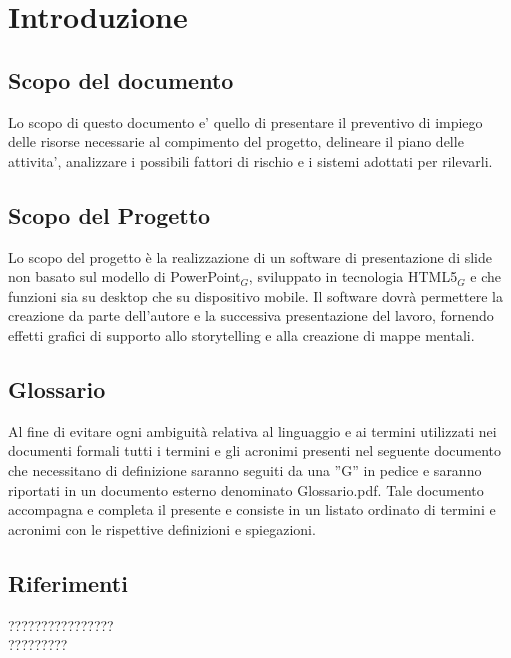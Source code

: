 \section{Introduzione}

\subsection{Scopo del documento}
Lo scopo di questo documento e' quello di presentare il preventivo di impiego delle risorse necessarie al compimento del progetto, delineare il piano delle attivita', analizzare i possibili fattori di rischio e i sistemi adottati per rilevarli.

\subsection{Scopo del Progetto}
Lo scopo del progetto è la realizzazione di un software di presentazione di slide non basato sul modello di PowerPoint$_{G}$, sviluppato in tecnologia HTML5$_{G}$ e che funzioni sia su desktop che su dispositivo mobile. Il software dovrà permettere la creazione da parte dell'autore e la successiva presentazione del lavoro, fornendo effetti grafici di supporto allo storytelling e alla creazione di mappe mentali. 

\subsection{Glossario}
Al fine di evitare ogni ambiguità relativa al linguaggio e ai termini utilizzati nei documenti formali tutti i termini e gli acronimi presenti nel seguente documento che necessitano di definizione saranno seguiti da una ”G” in pedice e saranno riportati in un documento esterno denominato Glossario.pdf. Tale documento accompagna e completa il presente e consiste in un listato ordinato di termini e acronimi con le rispettive definizioni e spiegazioni.

\subsection{Riferimenti}

????????????????\\
?????????\\
